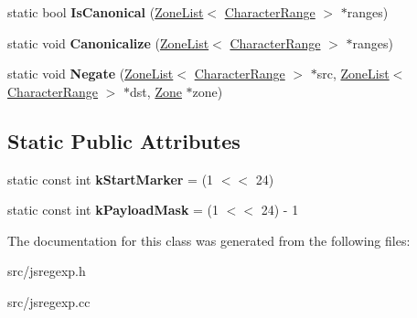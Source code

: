 \begin{DoxyCompactItemize}
\item 
\hypertarget{classv8_1_1internal_1_1_character_range_ad10e80af3f62972193297b904469cc06}{}static bool {\bfseries Is\+Canonical} (\hyperlink{classv8_1_1internal_1_1_zone_list}{Zone\+List}$<$ \hyperlink{classv8_1_1internal_1_1_character_range}{Character\+Range} $>$ $\ast$ranges)\label{classv8_1_1internal_1_1_character_range_ad10e80af3f62972193297b904469cc06}

\item 
\hypertarget{classv8_1_1internal_1_1_character_range_a0fc9872753da38b12f6dc6faaee66f9a}{}static void {\bfseries Canonicalize} (\hyperlink{classv8_1_1internal_1_1_zone_list}{Zone\+List}$<$ \hyperlink{classv8_1_1internal_1_1_character_range}{Character\+Range} $>$ $\ast$ranges)\label{classv8_1_1internal_1_1_character_range_a0fc9872753da38b12f6dc6faaee66f9a}

\item 
\hypertarget{classv8_1_1internal_1_1_character_range_a91a4a22eb1abca8e998f6a004a120c4f}{}static void {\bfseries Negate} (\hyperlink{classv8_1_1internal_1_1_zone_list}{Zone\+List}$<$ \hyperlink{classv8_1_1internal_1_1_character_range}{Character\+Range} $>$ $\ast$src, \hyperlink{classv8_1_1internal_1_1_zone_list}{Zone\+List}$<$ \hyperlink{classv8_1_1internal_1_1_character_range}{Character\+Range} $>$ $\ast$dst, \hyperlink{classv8_1_1internal_1_1_zone}{Zone} $\ast$zone)\label{classv8_1_1internal_1_1_character_range_a91a4a22eb1abca8e998f6a004a120c4f}

\end{DoxyCompactItemize}
\subsection*{Static Public Attributes}
\begin{DoxyCompactItemize}
\item 
\hypertarget{classv8_1_1internal_1_1_character_range_af71c0127ae30da61d62047b96dfa1804}{}static const int {\bfseries k\+Start\+Marker} = (1 $<$$<$ 24)\label{classv8_1_1internal_1_1_character_range_af71c0127ae30da61d62047b96dfa1804}

\item 
\hypertarget{classv8_1_1internal_1_1_character_range_a9bd1ec7131c945c2d221c4d43dec04fb}{}static const int {\bfseries k\+Payload\+Mask} = (1 $<$$<$ 24) -\/ 1\label{classv8_1_1internal_1_1_character_range_a9bd1ec7131c945c2d221c4d43dec04fb}

\end{DoxyCompactItemize}


The documentation for this class was generated from the following files\+:\begin{DoxyCompactItemize}
\item 
src/jsregexp.\+h\item 
src/jsregexp.\+cc\end{DoxyCompactItemize}
